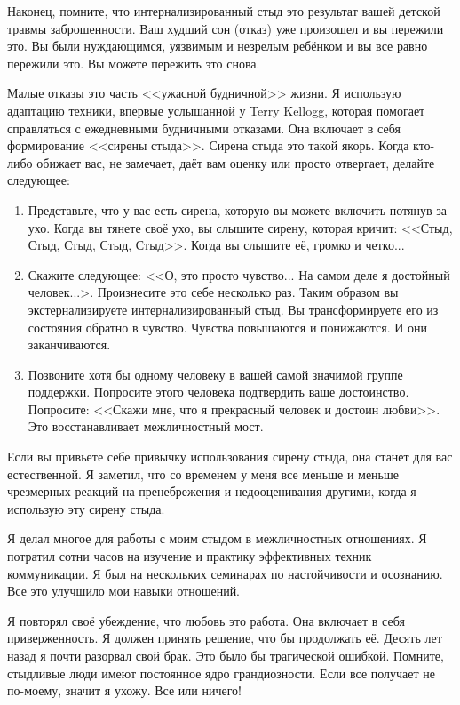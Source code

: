 \documentclass[10pt, fleqn]{article}
\begin{document}
Наконец, помните, что интернализированный стыд это результат вашей детской травмы заброшенности. Ваш худший сон (отказ) уже произошел и вы пережили это. Вы были нуждающимся, уязвимым и незрелым ребёнком и вы все равно пережили это. Вы можете пережить это снова.


Малые отказы это часть <<ужасной будничной>> жизни. Я использую адаптацию техники, впервые услышанной у Terry Kellogg, которая помогает справляться с ежедневными будничными отказами. Она включает в себя формирование <<сирены стыда>>. Сирена стыда это такой якорь. Когда кто-либо обижает вас, не замечает, даёт вам оценку или просто отвергает, делайте следующее:

\begin{enumerate}
\item Представьте, что у вас есть сирена, которую вы можете включить потянув за ухо. Когда вы тянете своё ухо, вы слышите сирену, которая кричит: <<Стыд, Стыд, Стыд, Стыд, Стыд>>. Когда вы слышите её, громко и четко...

\item Скажите следующее: <<О, это просто чувство... На самом деле я достойный человек...>. Произнесите это себе несколько раз. Таким образом вы экстернализируете интернализированный стыд. Вы трансформируете его из состояния обратно в чувство. Чувства повышаются и понижаются. И они заканчиваются.

\item Позвоните хотя бы одному человеку в вашей самой значимой группе поддержки. Попросите этого человека подтвердить ваше достоинство. Попросите: <<Скажи мне, что я прекрасный человек и достоин любви>>. Это восстанавливает межличностный мост.
\end{enumerate}

Если вы привьете себе привычку использования сирену стыда, она станет для вас естественной. Я заметил, что со временем у меня все меньше и меньше чрезмерных реакций на пренебрежения и недооценивания другими, когда я использую эту сирену стыда.



Я делал многое для работы с моим стыдом в межличностных отношениях. Я потратил сотни часов на изучение и практику эффективных техник коммуникации. Я был на нескольких семинарах по настойчивости и осознанию. Все это улучшило мои навыки отношений.


Я повторял своё убеждение, что любовь это работа. Она включает в себя приверженность. Я должен принять решение, что бы продолжать её. Десять лет назад я почти разорвал свой брак. Это было бы трагической ошибкой. Помните, стыдливые люди имеют постоянное ядро грандиозности. Если все получает не по-моему, значит я ухожу. Все или ничего!
\end{document}
